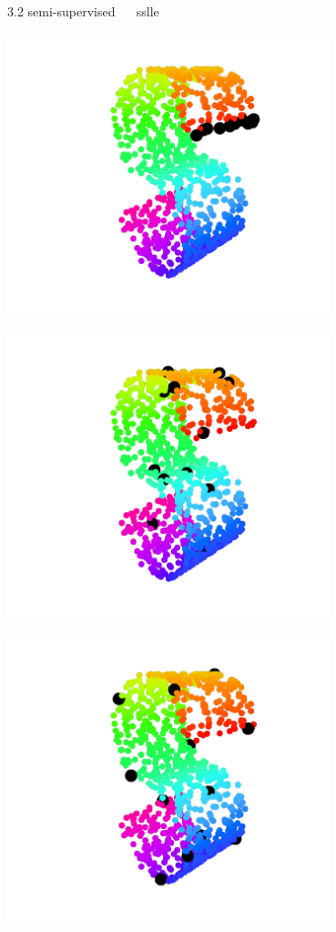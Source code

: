 \documentclass[11pt, compress, t, notes = noshow, xcolor = table, 
aspectratio = 1610]{beamer}
\begin{document}
\begin{frame}{\textcolor{gray!90}{3.2 semi-supervised} ~~ sslle}
\begin{minipage}[t]{0.33\textwidth}
  \includegraphics[trim = 80 20 60 0, clip, %
      width = 0.7\textwidth]{figures/s-curve-pp-poor}
\end{minipage}%
\begin{minipage}[t]{0.33\textwidth}
  \includegraphics[trim = 80 20 60 0, clip, %
      width = 0.7\textwidth]{figures/s-curve-pp-random}
\end{minipage}%
\begin{minipage}[t]{0.33\textwidth}
    \includegraphics[trim = 80 20 60 0, clip, %
    width = 0.7\textwidth]{figures/s-curve-pp-maxmin}
\end{minipage}


\end{frame}
\end{document}
